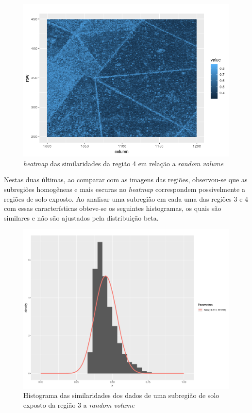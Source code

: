 \documentclass[12pt]{article}
\begin{document}
\begin{figure}[!h]

  \centering
  \includegraphics[width=0.8\linewidth]{../../Images/Report_19_02_27/heatmap_rv_region4.png}
  \caption{\textit{heatmap} das similaridades da região 4 em relação a \textit{random volume}}
  \label{fig:heat_rv4}

\end{figure}

\newpage

Nestas duas últimas, ao comparar com as imagens das regiões, observou-se que as subregiões homogêneas e mais escuras no \textit{heatmap} correspondem possivelmente a regiões de solo exposto. Ao analisar uma subregião em cada uma das regiões 3 e 4 com essas características obteve-se os seguintes histogramas, os quais são similares e não são ajustados pela distribuição beta.

\begin{figure}[!h]

  \centering
  \includegraphics[width=0.75\linewidth]{../../Figures/Report_19_02_27/hist_rv_subregion3.pdf}
  \caption{Histograma das similaridades dos dados de uma subregião de solo exposto da região 3 a \textit{random volume}}
  \label{fig:hist_sub_rv3}

\end{figure}
\end{document}
